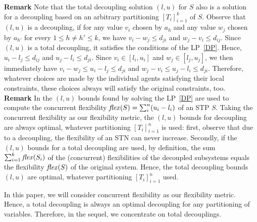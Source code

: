 \noindent
{\bf Remark }Note that the total decoupling solution $(l, u)$ for $S$ also is a solution for a decoupling based on an arbitrary partitioning $[T_i ]^k_{i=1}$ of $S$. Observe that $(l, u)$ is a decoupling, if for any value $v_i$ chosen by $a_h$ and any value $w_j$ chosen by $a_{h'}$ for every
$1 \leq h \neq h' \leq k$, we have $v_i - w_j \leq d_{ji}$ and $w_j - v_i \leq d_{ij}$. Since $(l, u)$ is a total decoupling, it satisfies the conditions of the LP~\ref{DP}. Hence, $u_i - l_j \leq d_{ij}$ and $u_j - l_i \leq d_{ji}$. Since $v_i \in [l_i, u_i]$ and $w_j \in [l_j, u_j]$, we then immediately have $v_i - w_j \leq u_i - l_j \leq d_{ji}$ and $w_j - v_i \leq u_j - l_i \leq d_{ji}$.
Therefore, whatever choices are made by the individual agents satisfying their local constraints, these choices always will satisfy the original constraints, too. \blbox\\

\noindent
{\bf Remark } In \cite{wilson:2013} the $(l,u)$ bounds found by solving the LP~\ref{DP} are used to compute the concurrent flexibility $\mathit{flex}(S)= \sum^n_i (u_i - l_i)$ of an STP $S$.
Taking the concurrent flexibility as our flexibility metric, the $(l, u)$ bounds for decoupling are always optimal, whatever partitioning $[T_i]^n_{i=1}$ is used: first, observe that due to a decoupling, the flexibility of an STN can never increase. Secondly, if the $(l,u)$ bounds for a total decoupling are used, by definition, the sum $\sum^k_{i=1} \mathit{flex}(S_i)$ of the (concurrent) flexibilities of the decoupled subsystems equals the flexibility $\mathit{flex}(S)$ of the original system. Hence, the total decoupling bounds $(l, u)$ are optimal, whatever partitioning $[T_i]^n_{i=1}$ used. \blbox

In this paper, we will consider concurrent flexibility as our flexibility metric. Hence, a total decoupling is always an optimal decoupling for any partitioning of variables.
Therefore, in the sequel, we concentrate on total decouplings.



